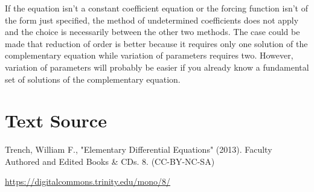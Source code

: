 \documentclass{ximera}
\begin{document}
If the equation isn't  a constant coefficient equation or the forcing
function isn't  of the form just specified,  the method of
undetermined coefficients does not apply and the choice is necessarily
between the other two methods. The case could be made that reduction
of order is better because it requires only one solution of the
complementary equation while variation of parameters requires two.
However, variation of parameters will probably be easier if you
already know a fundamental set of solutions of the complementary
equation.



\section*{Text Source}
Trench, William F., "Elementary Differential Equations" (2013). Faculty Authored and Edited Books \& CDs. 8. (CC-BY-NC-SA)

\href{https://digitalcommons.trinity.edu/mono/8/}{https://digitalcommons.trinity.edu/mono/8/}
\end{document}
